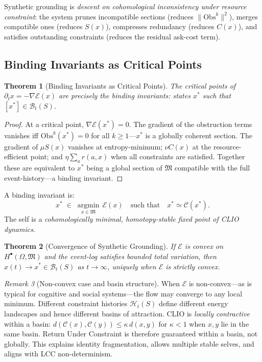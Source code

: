 \documentclass[11pt, letterpaper]{article}
\theoremstyle{plain}
\newtheorem{theorem}{Theorem}[section]
\theoremstyle{definition}
\theoremstyle{remark}
\newtheorem{remark}[theorem]{Remark}
\newcommand{\BI}{\mathcal{B}}
\newcommand{\CC}{\mathcal{C}}
\newcommand{\HH}{\mathcal{H}}
\newcommand{\MM}{\mathfrak{M}}
\newcommand{\EE}{\mathcal{E}}
\newcommand{\Obs}{\mathrm{Obs}}
\newcommand{\grad}{\nabla}
\newcommand{\argmin}{\operatorname*{argmin}}
\begin{document}
Synthetic grounding is \emph{descent on cohomological inconsistency under resource
constraint}: the system prunes incompatible sections (reduces $\|\Obs^k\|^2$), merges
compatible ones (reduces $S(x)$), compresses redundancy (reduces $C(x)$), and
satisfies outstanding constraints (reduces the residual ask-cost term).

\subsection{Binding Invariants as Critical Points}

\begin{theorem}[Binding Invariants as Critical Points]
\label{thm:critical}
The critical points of $\partial_t x = -\grad\EE(x)$ are precisely the binding
invariants: states $x^*$ such that $[x^*] \in \BI_t(S)$.
\end{theorem}

\begin{proof}
At a critical point, $\grad\EE(x^*) = 0$. The gradient of the obstruction terms
vanishes iff $\Obs^k(x^*) = 0$ for all $k \geq 1$---$x^*$ is a globally coherent
section. The gradient of $\mu S(x)$ vanishes at entropy-minimum; $\nu C(x)$ at the
resource-efficient point; and $\eta\sum_a r(a,x)$ when all constraints are satisfied.
Together these are equivalent to $x^*$ being a global section of $\MM$ compatible with
the full event-history---a binding invariant.
\end{proof}

A binding invariant is:
\[
  x^* \;\in\; \argmin_{x \in \MM}\,\EE(x)
  \quad\text{such that}\quad x^* \simeq \CC(x^*).
\]
The self is a \emph{cohomologically minimal, homotopy-stable fixed point of CLIO
dynamics}.

\begin{theorem}[Convergence of Synthetic Grounding]
\label{thm:convergence}
If $\EE$ is convex on $H^\bullet(\Omega, \MM)$ and the event-log satisfies bounded
total variation, then $x(t) \to x^* \in \BI_t(S)$ as $t \to \infty$, uniquely when
$\EE$ is strictly convex.
\end{theorem}

\begin{remark}[Non-convex case and basin structure]
When $\EE$ is non-convex---as is typical for cognitive and social systems---the flow
may converge to any local minimum. Different constraint histories $\HH_t(S)$ define
different energy landscapes and hence different basins of attraction. CLIO is
\emph{locally contractive} within a basin:
$d(\CC(x), \CC(y)) \leq \kappa\, d(x,y)$ for $\kappa < 1$ when $x, y$ lie in the
same basin. Return Under Constraint is therefore guaranteed within a basin, not
globally. This explains identity fragmentation, allows multiple stable selves, and
aligns with LCC non-determinism.
\end{remark}
\end{document}
